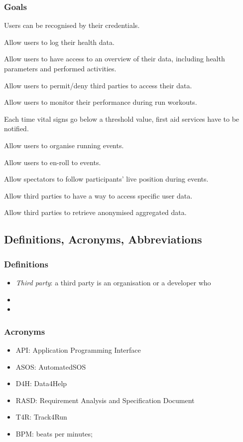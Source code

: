 \documentclass{article}
\begin{document}
\subsubsection{Goals}
\begin{enumerate}[label={\textbf{[G\arabic*]}}]
\item Users can be recognised by their credentials.
\item Allow users to log their health data.
\item Allow users to have access to an overview of their data, including health parameters and performed activities.
\item Allow users to permit/deny third parties to access their data.
\item Allow users to monitor their performance during run workouts.
\item Each time vital signs go below a threshold value, first aid services have to be notified.
\item Allow users to organise running events.
\item Allow users to en-roll to events.
\item Allow spectators to follow participants’ live position during events.
\item Allow third parties to have a way to access specific user data.
\item Allow third parties to retrieve anonymised aggregated data.
\end{enumerate}


\subsection{Definitions, Acronyms, Abbreviations}

\subsubsection{Definitions}
\begin{itemize}
	\item \textit{Third party}: a third party is an organisation or a developer who 
	\item 
	\item
\end{itemize}

\subsubsection{Acronyms}
\begin{itemize}
\item API: Application Programming Interface
\item ASOS: AutomatedSOS
\item D4H: Data4Help
\item RASD:  Requirement Analysis and Specification Document 
\item T4R: Track4Run 
\item BPM: beats per minutes;
\end{itemize}
\end{document}
